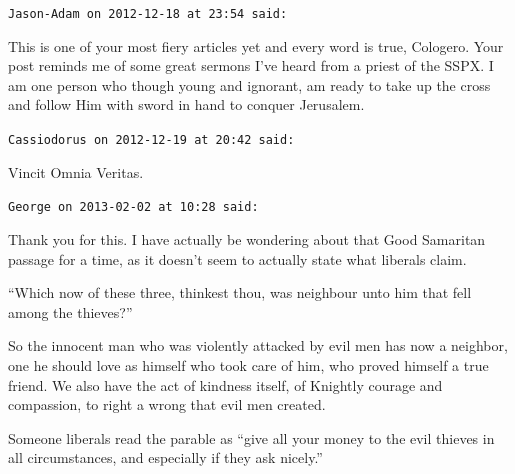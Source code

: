 \begin{footnotesize}
\begin{sffamily}
\texttt{Jason-Adam on 2012-12-18 at 23:54 said:}

This is one of your most fiery articles yet and every word is true, Cologero. Your post reminds me of some great sermons I've heard from a priest of the SSPX. I am one person who though young and ignorant, am ready to take up the cross and follow Him with sword in hand to conquer Jerusalem.

\hfill

\texttt{Cassiodorus on 2012-12-19 at 20:42 said:}

Vincit Omnia Veritas.

\hfill

\texttt{George on 2013-02-02 at 10:28 said:}

Thank you for this. I have actually be wondering about that Good Samaritan passage for a time, as it doesn't seem to actually state what liberals claim.

``Which now of these three, thinkest thou, was neighbour unto him that fell among the thieves?''

So the innocent man who was violently attacked by evil men has now a neighbor, one he should love as himself who took care of him, who proved himself a true friend. We also have the act of kindness itself, of Knightly courage and compassion, to right a wrong that evil men created.

Someone liberals read the parable as ``give all your money to the evil thieves in all circumstances, and especially if they ask nicely.''


\hfill

\end{sffamily}
\end{footnotesize}

